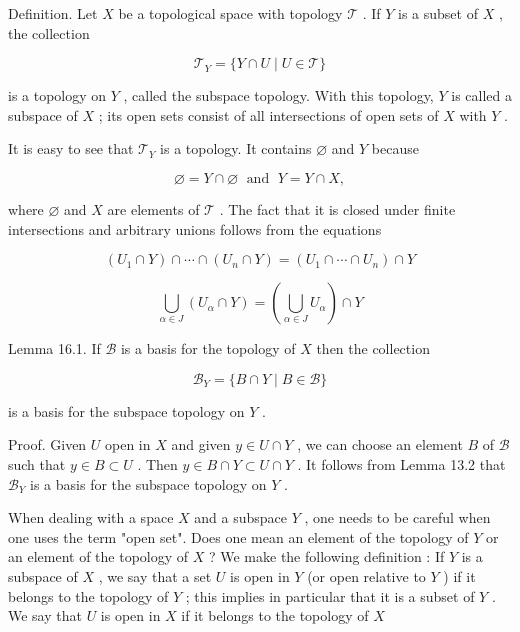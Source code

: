 Definition. Let \(X\) be a topological space with topology \(\mathcal{T}\) . If \(Y\) is a subset of \(X\) , the collection

\[
{\mathcal{T}}_{Y} = \{ Y \cap  U \mid  U \in  \mathcal{T}\}
\]

is a topology on \(Y\) , called the subspace topology. With this topology, \(Y\) is called a subspace of \(X\) ; its open sets consist of all intersections of open sets of \(X\) with \(Y\) .

It is easy to see that \({\mathcal{T}}_{Y}\) is a topology. It contains \(\varnothing\) and \(Y\) because

\[
\varnothing  = Y \cap  \varnothing \;\text{ and }\;Y = Y \cap  X,
\]

where \(\varnothing\) and \(X\) are elements of \(\mathcal{T}\) . The fact that it is closed under finite intersections and arbitrary unions follows from the equations

\[
\left( {{U}_{1} \cap  Y}\right)  \cap  \cdots  \cap  \left( {{U}_{n} \cap  Y}\right)  = \left( {{U}_{1} \cap  \cdots  \cap  {U}_{n}}\right)  \cap  Y
\]

\[
\mathop{\bigcup }\limits_{{\alpha  \in  J}}\left( {{U}_{\alpha } \cap  Y}\right)  = \left( {\mathop{\bigcup }\limits_{{\alpha  \in  J}}{U}_{\alpha }}\right)  \cap  Y
\]

Lemma 16.1. If \(\mathcal{B}\) is a basis for the topology of \(X\) then the collection

\[
{\mathcal{B}}_{Y} = \{ B \cap  Y \mid  B \in  \mathcal{B}\}
\]

is a basis for the subspace topology on \(Y\) .

Proof. Given \(U\) open in \(X\) and given \(y \in  U \cap  Y\) , we can choose an element \(B\) of \(\mathcal{B}\) such that \(y \in  B \subset  U\) . Then \(y \in  B \cap  Y \subset  U \cap  Y\) . It follows from Lemma 13.2 that \({\mathcal{B}}_{Y}\) is a basis for the subspace topology on \(Y\) .

When dealing with a space \(X\) and a subspace \(Y\) , one needs to be careful when one uses the term "open set". Does one mean an element of the topology of \(Y\) or an element of the topology of \(X\) ? We make the following definition : If \(Y\) is a subspace of \(X\) , we say that a set \(U\) is open in \(Y\) (or open relative to \(Y\) ) if it belongs to the topology of \(Y\) ; this implies in particular that it is a subset of \(Y\) . We say that \(U\) is open in \(X\) if it belongs to the topology of \(X\)

